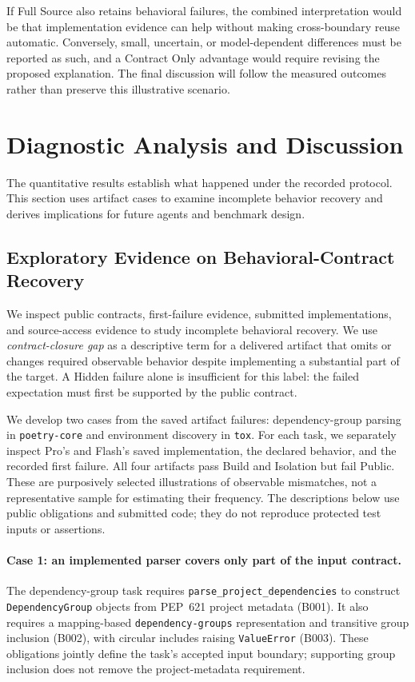 \documentclass[acmsmall,screen,review,anonymous,nonacm]{acmart}
\begin{document}
If Full Source also retains behavioral failures, the combined interpretation
would be that implementation evidence can help without making cross-boundary
reuse automatic. Conversely, small, uncertain, or model-dependent differences
must be reported as such, and a Contract Only advantage would require revising
the proposed explanation. The final discussion will follow the measured
outcomes rather than preserve this illustrative scenario.

\section{Diagnostic Analysis and Discussion}
\label{sec:diagnostics}

The quantitative results establish what happened under the recorded protocol.
This section uses artifact cases to examine incomplete behavior recovery and
derives implications for future agents and benchmark design.

\subsection{Exploratory Evidence on Behavioral-Contract Recovery}
\label{sec:cases}

We inspect public contracts, first-failure evidence, submitted implementations,
and source-access evidence to study incomplete behavioral recovery. We use
\emph{contract-closure gap} as a descriptive term for a delivered artifact
that omits or changes required observable behavior despite implementing a
substantial part of the target. A Hidden failure alone is insufficient for this
label: the failed expectation must first be supported by the public contract.

We develop two cases from the saved artifact failures: dependency-group parsing
in \texttt{poetry-core} and environment discovery in \texttt{tox}. For each task,
we separately inspect Pro's and Flash's saved implementation, the declared
behavior, and the recorded first failure. All four artifacts pass Build and
Isolation but fail Public. These are purposively selected illustrations of
observable mismatches, not a representative sample for estimating their
frequency. The descriptions below use public obligations and submitted code;
they do not reproduce protected test inputs or assertions.

\paragraph{Case 1: an implemented parser covers only part of the input contract.}
The dependency-group task requires
\texttt{parse\_project\_dependencies} to construct \texttt{DependencyGroup}
objects from PEP~621 project metadata (B001). It also requires a mapping-based
\texttt{dependency-groups} representation and transitive group inclusion (B002),
with circular includes raising \texttt{ValueError} (B003). These obligations
jointly define the task's accepted input boundary; supporting group inclusion
does not remove the project-metadata requirement.
\end{document}
